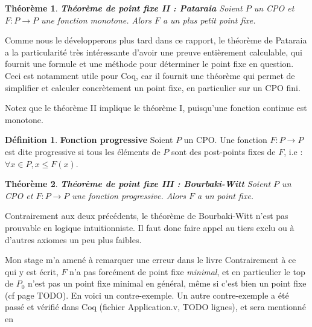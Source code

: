 \documentclass{article}
\newtheorem{theorem}{Théorème}[section]
\theoremstyle{definition}
\newtheorem{definition}{Définition}[section]
\begin{document}
\begin{theorem}{\textbf{Théorème de point fixe II : Pataraia}}
Soient $P$ un CPO et $F : P \rightarrow P$ une fonction monotone. Alors $F$ a un plus petit point fixe.
\end{theorem}

Comme nous le développerons plus tard dans ce rapport, le théorème de Pataraia a la particularité très intéressante d'avoir une preuve entièrement calculable, qui fournit une formule et une méthode pour déterminer le point fixe en question. %
Ceci est notamment utile pour Coq, car il fournit une théorème qui permet de simplifier et calculer concrètement un point fixe, en particulier sur un CPO fini.

Notez que le théorème II implique le théorème I, puisqu'une fonction continue est monotone.

\begin{definition}{\textbf{Fonction progressive}}
Soient $P$ un CPO. Une fonction $F : P \rightarrow P$ est dite progressive si tous les éléments de $P$ sont des post-points fixes de $F$, i.e : $\forall x \in P, x \leq F(x)$.

\end{definition}

\begin{theorem}{\textbf{Théorème de point fixe III : Bourbaki-Witt}}
Soient $P$ un CPO et $F : P \rightarrow P$ une fonction progressive. Alors $F$ a un point fixe.
\end{theorem}

Contrairement aux deux précédents, le théorème de Bourbaki-Witt n'est pas prouvable en logique intuitionniste. Il faut donc faire appel au tiers exclu ou à d'autres axiomes un peu plus faibles. %

Mon stage m'a amené à remarquer une erreur dans le livre %
Contrairement à ce qui y est écrit, $F$ n'a pas forcément de point fixe \emph{minimal}, et en particulier le top de $P_0$ n'est pas un point fixe minimal en général, même si c'est bien un point fixe (cf page TODO). En voici un contre-exemple. Un autre contre-exemple a été passé et vérifié dans Coq (fichier Application.v, TODO lignes), et sera mentionné en %
\end{document}
